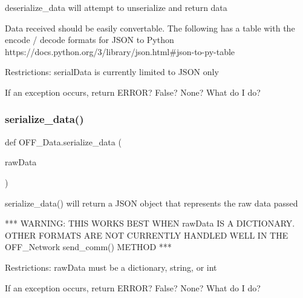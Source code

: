 \begin{DoxyVerb}deserialize_data will attempt to unserialize and return data

Data received should be easily convertable. The following has a table
with the encode / decode formats for  JSON to Python
https://docs.python.org/3/library/json.html#json-to-py-table

Restrictions:
    serialData is currently limited to JSON only

If an exception occurs, return ERROR? False? None? What do I do?
\end{DoxyVerb}
 \mbox{\label{namespace_o_f_f___data_a826cab3cf308a0e882e8386544f49f7b}} 
\subsubsection{\texorpdfstring{serialize\+\_\+data()}{serialize\_data()}}
{\footnotesize\ttfamily def O\+F\+F\+\_\+\+Data.\+serialize\+\_\+data (\begin{DoxyParamCaption}\item[{}]{raw\+Data }\end{DoxyParamCaption})}

\begin{DoxyVerb}serialize_data() will return a JSON object that represents the raw data
passed

*** WARNING: THIS WORKS BEST WHEN rawData IS A DICTIONARY. OTHER FORMATS
ARE NOT CURRENTLY HANDLED WELL IN THE OFF_Network send_comm() METHOD ***

Restrictions:
    rawData must be a dictionary, string, or int

If an exception occurs, return ERROR? False? None? What do I do?
\end{DoxyVerb}
 